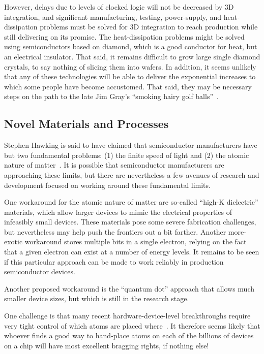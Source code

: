 However, delays due to levels of clocked logic will not be decreased
by 3D integration, and significant manufacturing, testing, power-supply,
and heat-dissipation problems must be solved for 3D integration to
reach production while still delivering on its promise.
The heat-dissipation problems might be solved using
semiconductors based on diamond, which is a good conductor
for heat, but an electrical insulator.
That said, it remains difficult to grow large single diamond crystals,
to say nothing of slicing them into wafers.
In addition, it seems unlikely that any of these technologies will be able to
deliver the exponential increases to which some people have become accustomed.
That said, they may be necessary steps on the path to the late Jim Gray's
``smoking hairy golf balls''~\cite{JimGray2002SmokingHairyGolfBalls}.

\fi

\subsection{Novel Materials and Processes}
\label{sec:cpu:Novel Materials and Processes}

Stephen Hawking is said to have claimed that semiconductor manufacturers
have but two fundamental problems: (1) the finite speed of light and
(2) the atomic nature of matter~\cite{BryanGardiner2007}.
It is possible that semiconductor manufacturers are approaching these
limits, but there are nevertheless a few avenues of research and
development focused on working around these fundamental limits.

One workaround for the atomic nature of matter are so-called
``high-K dielectric'' materials, which allow larger devices to mimic the
electrical properties of infeasibly small devices.
These materials pose some severe fabrication challenges, but nevertheless
may help push the frontiers out a bit farther.
Another more-exotic workaround stores multiple bits in a single electron,
relying on the fact that a given electron can exist at a number of
energy levels.
It remains to be seen if this particular approach can be made to work
reliably in production semiconductor devices.

Another proposed workaround is the ``quantum dot'' approach that
allows much smaller device sizes, but which is still in the research
stage.

One challenge is that many recent hardware-device-level breakthroughs
require very tight control of which atoms are placed
where~\cite{MichaelJKelly2017DeviceLevel}.
It therefore seems likely that whoever finds a good way to hand-place
atoms on each of the billions of devices on a chip will have most
excellent bragging rights, if nothing else!

